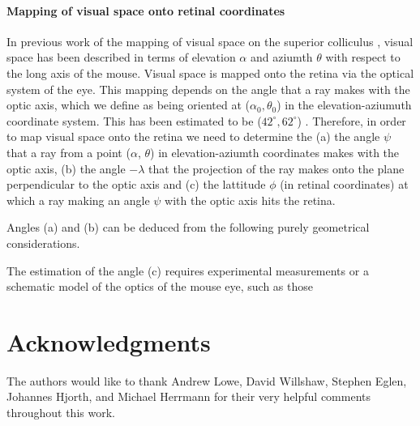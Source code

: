 \documentclass[10pt]{article}
\begin{document}
\paragraph{Mapping of visual space onto retinal coordinates}

In previous work of the mapping of visual space on the superior
colliculus \cite{DragHube76topo}, visual space has been described in
terms of elevation $\alpha$ and aziumth $\theta$ with respect to the
long axis of the mouse. Visual space is mapped onto the retina via the
optical system of the eye. This mapping depends on the angle that a
ray makes with the optic axis, which we define as being oriented at
($\alpha_0, \theta_0$) in the elevation-aziumuth coordinate
system. This has been estimated to be ($42^\circ, 62^\circ$)
\cite{DragHube76topo} .
Therefore, in order to map visual space onto the retina we need to
determine the (a) the angle $\psi$ that a ray from a point ($\alpha$,
$\theta$) in elevation-aziumth coordinates makes with the optic axis,
(b) the angle $-\lambda$ that the projection of the ray makes onto the
plane perpendicular to the optic axis and (c) the lattitude $\phi$ (in
retinal coordinates) at which a ray making an angle $\psi$ with the
optic axis hits the retina. 

Angles (a) and (b) can be deduced from the following purely geometrical
considerations. 

The estimation of the angle (c) requires experimental
measurements or a schematic model of the optics of the mouse eye, such
as those




\section*{Acknowledgments}

The authors would like to thank Andrew Lowe, David Willshaw, Stephen
Eglen, Johannes Hjorth, and Michael Herrmann for their very helpful
comments throughout this work.

\newcommand{\myshortjournaltitles}{}

%
\end{document}
